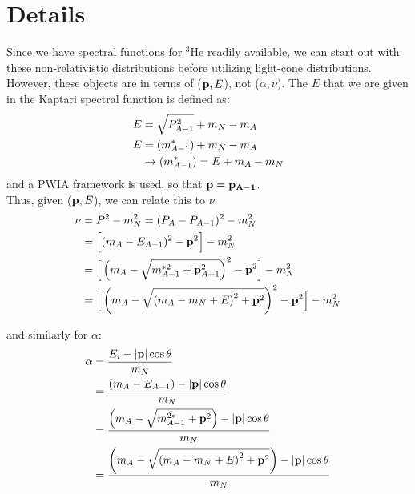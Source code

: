 \documentclass{article}
\begin{document}
\section{\Large{Details}}
Since we have spectral functions for $^3$He readily available, we can start out with these non-relativistic distributions before utilizing light-cone distributions. 
However, these objects are in terms of (${\bf{p}},E$), not ($\alpha,\nu$). The $E$ that we are given in the Kaptari spectral function is defined as:
\begin{eqnarray}
	\centering
	\begin{split}				
		E &= \sqrt{P_{A-1}^2} + m_N - m_A						\\
		E &= (m_{A-1}^*) + m_N - m_A							\\
		& \rightarrow (m_{A-1}^*) = E + m_A - m_N				\\
	\end{split}
\end{eqnarray}
and a PWIA framework is used, so that ${\bf{p}} = {\bf{p_{A-1}}}$.\\


Thus, given (${\bf{p}},E$), we can relate this to $\nu$:
\begin{eqnarray}
	\centering
	\begin{split}	
		\nu &= P^2 - m_N^2 = (P_A - P_{A-1})^2 - m_N^2											\\
		      &= \Big[(m_A - E_{A-1})^2 - {\bf{p}}^2\Big] - m_N^2										\\
		      &= \Big[\left(m_A - \sqrt{m_{A-1}^{*2} + {\bf{p}}_{A-1}^2} \right)^2 - {\bf{p}}^2\Big] - m_N^2			\\
		      &= \Big[\left(m_A - \sqrt{\left(m_A-m_N+E\right)^2 + {\bf{p}}^2} \right)^2 - {\bf{p}}^2\Big] - m_N^2
	\end{split}
\end{eqnarray}

and similarly for $\alpha$:
\begin{eqnarray}
	\centering
	\begin{split}	
		\alpha &= \frac{E_i - |{\bf{p}}| \cos{\theta}}{m_N}													\\
		      	   &= \frac{(m_A-E_{A-1}) - |{\bf{p}}|\cos{\theta}}{m_N}											\\
			   &=	\frac{ \left( m_A - \sqrt{m_{A-1}^{2*} + {\bf{p}}^2} \right) - |{\bf{p}}|\cos{\theta} }{ m_N }					\\
			   &=	\frac{ \left( m_A - \sqrt{\left(m_A-m_N+E\right)^{2} + {\bf{p}}^2} \right) - |{\bf{p}}|\cos{\theta} }{ m_N }		\\
	\end{split}
\end{eqnarray}
\end{document}
